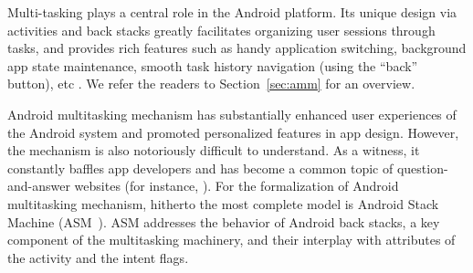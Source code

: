 \documentclass[preprint,12pt]{elsarticle}
\newcommand\standard{{\sf STD}}
\newcommand\singletop{{\sf STP}}
\newcommand\singletask{{\sf STK}}
\newcommand\singleinstance{{\sf SIT}}
\newcommand{\AMASS}{\textsf{ASM}}
\begin{document}
Multi-tasking plays a central role in the Android platform. Its unique design via activities and back stacks greatly facilitates organizing user sessions through tasks, and provides rich features such as handy application switching, background app state maintenance, smooth task history navigation (using the ``back'' button), etc \cite{RZXWL15}. We refer the readers to Section~\ref{sec:amm} for an overview. 

Android multitasking mechanism has substantially enhanced user experiences of the Android system and promoted personalized features in app design. However, the mechanism is also notoriously difficult to understand. As a witness, it constantly baffles app developers and has become a common topic of question-and-answer websites (for instance, \cite{stackoverflow}).
%
%
For the formalization of Android multitasking mechanism, hitherto the most complete %
model is Android Stack Machine ({\AMASS}~\cite{HC+19}). %
%
{\AMASS} addresses the behavior of Android back stacks, a key component of the multitasking machinery, and their interplay with attributes of the activity and the intent flags. 
\end{document}
